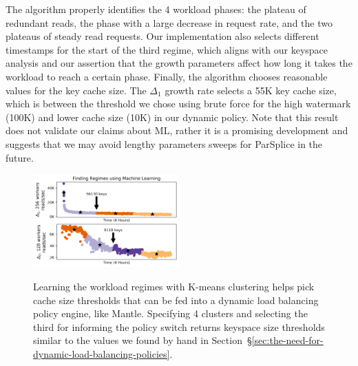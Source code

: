 The algorithm properly identifies the 4 workload phases: the plateau of
redundant reads, the phase with a large decrease in request rate, and the two
plateaus of steady read requests. Our implementation also selects different
timestamps for the start of the third regime, which aligns with our keyspace
analysis and our assertion that the growth parameters affect how long it takes
the workload to reach a certain phase.  Finally, the algorithm chooses
reasonable values for the key cache size. The \(\Delta_1\) growth rate selects
a 55K key cache size, which is between the threshold we chose using brute force
for the high watermark (100K) and lower cache size (10K) in our dynamic policy.
Note that this result does not validate our claims about ML, rather it is a
promising development and suggests that we may avoid lengthy parameters sweeps
for ParSplice in the future.

\begin{figure}[t]
\noindent\includegraphics[width=0.5\textwidth]{figures/futurework-regimes.png}\\
  \caption{Learning the workload regimes with K-means clustering helps pick
  cache size thresholds that can be fed into a dynamic load balancing policy
  engine, like Mantle. Specifying 4 clusters and selecting the third for
  informing the policy switch returns keyspace size thresholds similar to the
  values we found by hand in
  Section~\S\ref{sec:the-need-for-dynamic-load-balancing-policies}.
\label{fig:futurework-regimes}}
\end{figure}
